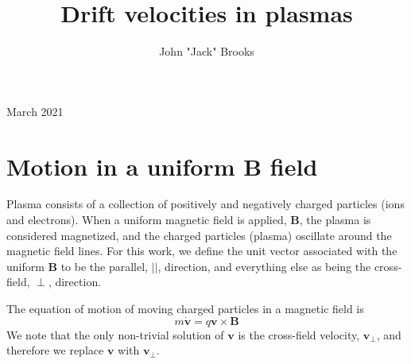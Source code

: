 \documentclass[12pt]{iopart}
\begin{document}
\title[Drift velocities in plasmas]{Drift velocities in plasmas}

\author{John "Jack" Brooks}

\vspace{10pt}
\begin{indented}
\item[]March 2021
\end{indented}


%
%
%
% 
%



\section{Motion in a uniform $\mathbf{B}$ field}

Plasma consists of a collection of positively and negatively charged particles (ions and electrons).  When a uniform magnetic field is applied, $\mathbf{B}$, the plasma is considered magnetized, and the charged particles (plasma) oscillate around the magnetic field lines.  For this work, we define the unit vector associated with the uniform $\mathbf{B}$ to be the parallel, $||$, direction, and everything else as being the cross-field, $\perp$, direction.

The equation of motion of moving charged particles in a magnetic field is
\begin{equation}
\label{eq:eom_simple}
m \dot{\mathbf{v}} = q \mathbf{v} \times \mathbf{B}
\end{equation}
We note that the only non-trivial solution of $\mathbf{v}$ is the cross-field velocity, $\mathbf{v}_\perp$, and therefore we replace $\mathbf{v}$ with $\mathbf{v}_\perp$.  
\end{document}
